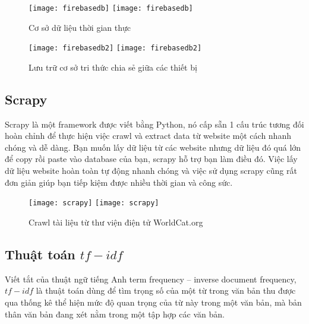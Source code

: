  \begin{figure}[!htbp]
  \begin{center}
    \ifpdf
      \texttt{[image: firebasedb]}
    \else
      \texttt{[image: firebasedb]}
    \fi
    \caption{Cơ sở dữ liệu thời gian thực }
    \label{FirebaseDB}
  \end{center}
\end{figure}

 \begin{figure}[!htbp]
  \begin{center}
    \ifpdf
      \texttt{[image: firebasedb2]}
    \else
      \texttt{[image: firebasedb2]}
    \fi
    \caption{Lưu trữ cơ sở tri thức chia sẻ giữa các thiết bị}
    \label{FirebaseDB2}
  \end{center}
\end{figure}

\subsection{Scrapy}

Scrapy là một framework được viết bằng Python, nó cấp sẵn 1 cấu trúc tương đối hoàn chỉnh để thực hiện việc crawl và extract data từ website một cách nhanh chóng và dễ dàng. Bạn muốn lấy dữ liệu từ các website nhưng dữ liệu đó quá lớn để copy rồi paste vào database của bạn, scrapy hỗ trợ bạn làm điều đó. Việc lấy dữ liệu website hoàn toàn tự động nhanh chóng và việc sử dụng scrapy cũng rất đơn giản giúp bạn tiếp kiệm được nhiều thời gian và công sức.

 \begin{figure}[!htbp]
  \begin{center}
    \ifpdf
      \texttt{[image: scrapy]}
    \else
      \texttt{[image: scrapy]}
    \fi
    \caption{Crawl tài liệu từ thư viện điện tử WorldCat.org }
    \label{Scrapy}
  \end{center}
\end{figure}

\subsection{Thuật toán $tf-idf$}

Viết tắt của thuật ngữ tiếng Anh term frequency – inverse document frequency,$tf-idf$ là thuật toán dùng để tìm trọng số của một từ trong văn bản thu được qua thống kê thể hiện mức độ quan trọng của từ này trong một văn bản, mà bản thân văn bản đang xét nằm trong một tập hợp các văn bản.

